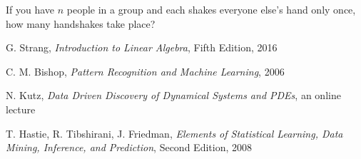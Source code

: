 \documentclass[10pt,twocolumn]{article}
\begin{document}
\newpage



If you have $n$ people in a group and each shakes everyone else's hand only once, how many handshakes take place?





\thebibliography{}



 G. Strang, \textit{Introduction to Linear Algebra}, Fifth Edition, 2016

 C. M. Bishop, \textit{Pattern Recognition and Machine Learning}, 2006

 N. Kutz, \textit{Data Driven Discovery of Dynamical Systems and PDEs}, an online lecture 

 T. Hastie, R. Tibshirani, J. Friedman, \textit{Elements of Statistical Learning, Data Mining, Inference, and Prediction}, Second Edition, 2008

 \label{bib:pope}
\end{document}
